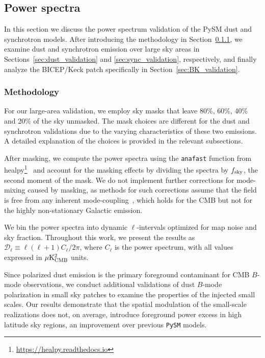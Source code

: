 \documentclass[twocolumn]{aastex631}
\begin{document}
\subsection{Power spectra}
\label{sec:PS-validation}
In this section we discuss the power spectrum validation of the PySM dust and synchrotron models. After introducing the methodology in Section~\ref{subsubsec:methods}, we examine dust and synchrotron emission over large sky areas in Sections~\ref{sec:dust_validation} and \ref{sec:sync_validation}, respectively, and finally analyze the BICEP/Keck patch specifically in Section~\ref{sec:BK_validation}.

\subsubsection{Methodology} \label{subsubsec:methods}
For our large-area validation, we employ sky masks that leave 80\%, 60\%, 40\% and 20\% of the sky unmasked. The mask choices are different for the dust and synchrotron validations due to the varying characteristics of these two emissions. A detailed explanation of the choices is provided in the relevant subsections. 

After masking, we compute the power spectra using the \texttt{anafast} function from healpy\footnote{\url{https://healpy.readthedocs.io}}~\citep{Zonca:2019} and account for the masking effects by dividing the spectra by $f_{\rm sky}$, the second moment of the mask. We do not implement further corrections for mode-mixing caused by masking, as methods for such corrections assume that the field is free from any inherent mode-coupling~\citep[e.g.,][]{Hivon:2002}, which holds for the CMB but not for the highly non-stationary Galactic emission. 

We bin the power spectra into dynamic $\ell$-intervals optimized for map noise and sky fraction. Throughout this work, we present the results as $\mathcal{D}_\ell \equiv \ell(\ell + 1) C_\ell / 2\pi$, where $C_\ell$ is the power spectrum, with all values expressed in $\mu{\rm K^2_{CMB}}$ units. 

Since polarized dust emission is the primary foreground contaminant for CMB $B$-mode observations, we conduct additional validations of dust $B$-mode polarization in small sky patches to examine the properties of the injected small scales. Our results demonstrate that the spatial modulation of the small-scale realizations does not, on average, introduce foreground power excess in high latitude sky regions, an improvement over previous \texttt{PySM} models.
\end{document}
